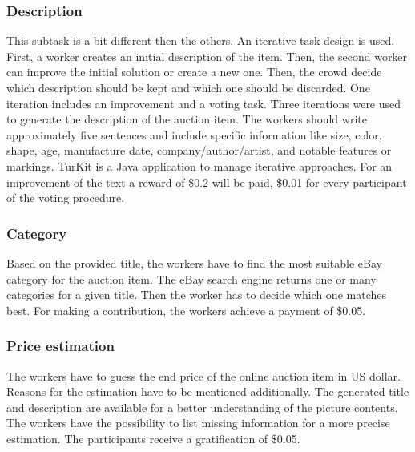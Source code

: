 \subsubsection{Description}
This subtask is a bit different then the others. An iterative task design is used. First, a worker creates an initial description of the item. Then, the second worker can improve the initial solution or create a new one. Then, the crowd decide which description should be kept and which one should be discarded. One iteration includes an improvement and a voting task. Three iterations were used to generate the description of the auction item. The workers should write approximately five sentences and include specific information like size, color, shape, age, manufacture date, company/author/artist, and notable features or markings. TurKit is a Java application to manage iterative approaches. For an improvement of the text a reward of \$0.2 will be paid, \$0.01 for every participant of the voting procedure.
\subsubsection{Category}
Based on the provided title, the workers have to find the most suitable eBay category for the auction item. The eBay search engine returns one or many categories for a given title. Then the worker has to decide which one matches best. For making a contribution, the workers achieve a payment of \$0.05.
\subsubsection{Price estimation}
The workers have to guess the end price of the online auction item in US dollar. Reasons for the estimation have to be mentioned additionally. The generated title and description are available for a better understanding of the picture contents. The workers have the possibility to list missing information for a more precise estimation. The participants receive a gratification of \$0.05.

